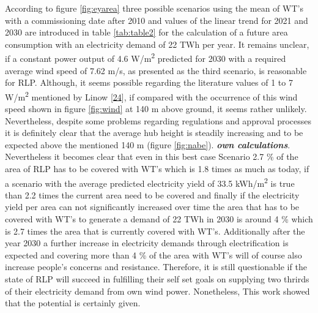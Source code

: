\documentclass[a4paper,11pt]{article}
\begin{document}
According to figure \ref{fig:eyarea} three possible scenarios using the mean of WT's with a commissioning date after 2010 and values of the linear trend for 2021 and 2030 are introduced in table \ref{tab:table2} for the calculation of a future area consumption with an electricity demand of 22 TWh per year. It remains unclear, if a constant power output of 4.6 W/m\textsuperscript{2} predicted for 2030 with a required average wind speed of 7.62 m/s, as presented as the third scenario, is reasonable for RLP. Although, it seems possible regarding the literature values of 1 to 7 W/m\textsuperscript{2} mentioned by Linow {[}\protect\hyperlink{ref-SvenLinow.2020}{24}{]}, if compared with the occurrence of this wind speed shown in figure \ref{fig:wind} at 140 m above ground, it seems rather unlikely. Nevertheless, despite some problems regarding regulations and approval processes it is definitely clear that the average hub height is steadily increasing and to be expected above the mentioned 140 m (figure \ref{fig:nabe}). \textbf{\emph{own calculations}}. Nevertheless it becomes clear that even in this best case Scenario 2.7 \% of the area of RLP has to be covered with WT's which is 1.8 times as much as today, if a scenario with the average predicted electricity yield of 33.5 kWh/m\textsuperscript{2} is true than 2.2 times the current area need to be covered and finally if the electricity yield per area can not significantly increased over time the area that has to be covered with WT's to generate a demand of 22 TWh in 2030 is around 4 \% which is 2.7 times the area that is currently covered with WT's. Additionally after the year 2030 a further increase in electricity demands through electrification is expected and covering more than 4 \% of the area with WT's will of course also increase people's concerns and resistance. Therefore, it is still questionable if the state of RLP will succeed in fulfilling their self set goals on supplying two thrirds of their electricity demand from own wind power. Nonetheless, This work showed that the potential is certainly given.
\end{document}
